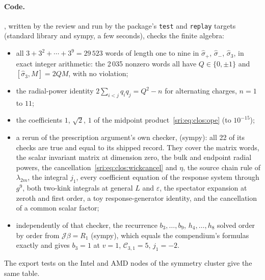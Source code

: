 \paragraph{Code.} , written by the review and run by the package's
\texttt{test} and \texttt{replay} targets (standard library and sympy, a few seconds), checks the finite algebra:
\begin{itemize}
\item all $3+3^2+\cdots+3^9=29\,523$ words of length one to nine in $\hat\sigma_+$, $\hat\sigma_-$, $\hat\sigma_3$, in
 exact integer arithmetic: the 2\,035 nonzero words all have $Q\in\{0,\pm1\}$ and $[\hat\sigma_3,M]=2QM$, with no
 violation;
\item the radial-power identity $2\sum_{i<j}q_iq_j=Q^2-n$ for alternating charges, $n=1$ to $11$;
\item the coefficients $1$, $\sqrt2$, $1$ of the midpoint product~\eqref{sri:eq:clos:ope} (to $10^{-15}$);
\item a rerun of the prescription argument's own checker,
  (sympy): all 22 of its checks are true and equal to its
 shipped record. They cover the matrix words, the scalar invariant matrix at dimension zero, the bulk and endpoint
 radial powers, the cancellation~\eqref{sri:eq:clos:wickcancel} and $\eta$, the source chain rule of $\lambda_{2m}$, the
 integral $j_1$, every coefficient equation of the response system through $g^9$, both two-kink integrals at general
 $L$ and $\varepsilon$, the spectator expansion at zeroth and first order, a toy response-generator identity, and the
 cancellation of a common scalar factor;
\item independently of that checker, the recurrence $b_3,\dots,b_9$, $h_4,\dots,h_8$ solved order by order from
 $\mathcal J\beta=R_1$ (sympy), which equals the compendium's formulas exactly and gives $b_3=1$ at $v=1$,
 $\mathcal C_{3,1}=5$, $j_1=-2$.
\end{itemize}
The export tests on the Intel and AMD nodes of the symmetry cluster give the same table.

